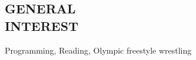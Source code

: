 \documentclass[margin]{res}
\begin{document}
\begin{resume}
\section{GENERAL\\INTEREST}
  Programming, Reading, Olympic freestyle wrestling

\end{resume}
\end{document}

